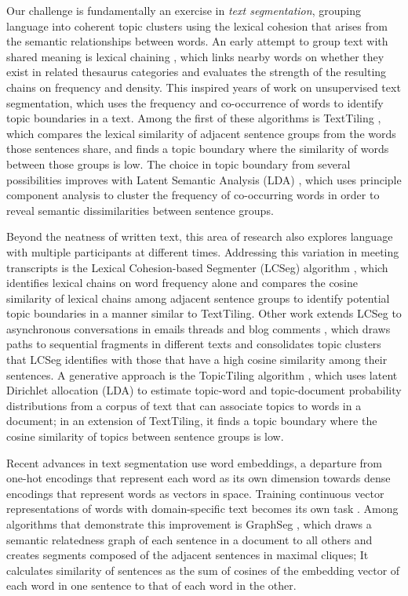 \documentclass[letterpaper, 12pt]{article}
\begin{document}
Our challenge is fundamentally an exercise in \textit{text segmentation}, grouping language into coherent topic clusters using the lexical cohesion that arises from the semantic relationships between words. An early attempt to group text with shared meaning is lexical chaining \cite{morris-hirst-1991-lexical}, which links nearby words on whether they exist in related thesaurus categories and evaluates the strength of the resulting chains on frequency and density. This inspired years of work on unsupervised text segmentation, which uses the frequency and co-occurrence of words to identify topic boundaries in a text. Among the first of these algorithms is TextTiling \cite{hearst-1997-texttiling}, which compares the lexical similarity of adjacent sentence groups from the words those sentences share, and finds a topic boundary where the similarity of words between those groups is low. The choice in topic boundary from several possibilities improves with Latent Semantic Analysis (LDA) \cite{choi-etal-2001-latent}, which uses principle component analysis to cluster the frequency of co-occurring words in order to reveal semantic dissimilarities between sentence groups.

Beyond the neatness of written text, this area of research also explores language with multiple participants at different times. Addressing this variation in meeting transcripts is the Lexical Cohesion-based Segmenter (LCSeg) algorithm \cite{galley-etal-2003-discourse}, which identifies lexical chains on word frequency alone and compares the cosine similarity of lexical chains among adjacent sentence groups to identify potential topic boundaries in a manner similar to TextTiling. Other work extends LCSeg to asynchronous conversations in emails threads and blog comments \cite{joty-etal-2013-topic}, which draws paths to sequential fragments in different texts and consolidates topic clusters that LCSeg identifies with those that have a high cosine similarity among their sentences. A generative approach is the TopicTiling algorithm \cite{riedl-biemann-2012-topictiling}, which uses latent Dirichlet allocation (LDA) \cite{blei-etal-2003-latent} to estimate topic-word and topic-document probability distributions from a corpus of text that can associate topics to words in a document; in an extension of TextTiling, it finds a topic boundary where the cosine similarity of topics between sentence groups is low.

Recent advances in text segmentation use word embeddings, a departure from one-hot encodings that represent each word as its own dimension towards dense encodings that represent words as vectors in space. Training continuous vector representations of words with domain-specific text becomes its own task \cite{mikolov-etal-2013-efficient}. Among algorithms that demonstrate this improvement is GraphSeg \cite{glavas-etal-2016-unsupervised}, which draws a semantic relatedness graph of each sentence in a document to all others and creates segments composed of the adjacent sentences in maximal cliques; It calculates similarity of sentences as the sum of cosines of the embedding vector of each word in one sentence to that of each word in the other.
\end{document}
